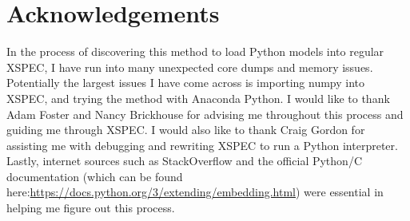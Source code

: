 \documentclass[12pt]{article}
\begin{document}
\section{Acknowledgements}
In the process of discovering this method to load Python models into regular XSPEC, I have run into many unexpected core dumps and memory issues. Potentially the largest issues I have come across is importing numpy into XSPEC, and trying the method with Anaconda Python. I would like to thank Adam Foster and Nancy Brickhouse for advising me throughout this process and guiding me through XSPEC. I would also like to thank Craig Gordon for assisting me with debugging and rewriting XSPEC to run a Python interpreter. Lastly, internet sources such as StackOverflow and the official Python/C documentation (which can be found here:\url{https://docs.python.org/3/extending/embedding.html}) were essential in helping me figure out this process. 
 \newline

\newpage

\end{document}

